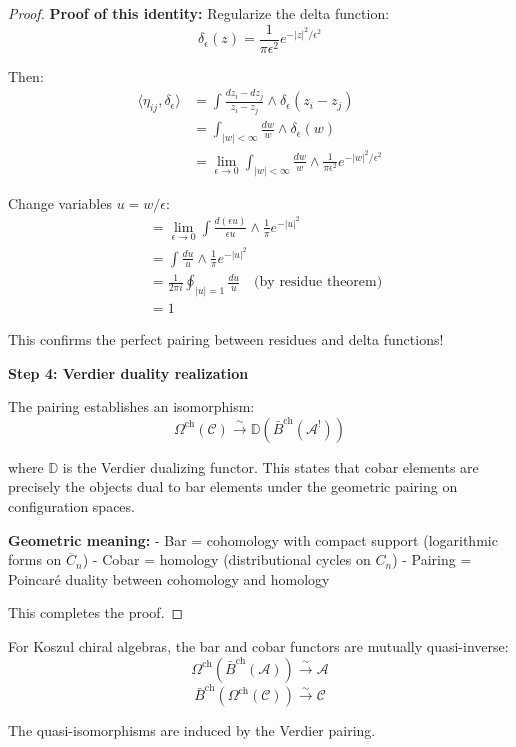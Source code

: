 \begin{proof}
\textbf{Proof of this identity:} Regularize the delta function:
$$\delta_\epsilon(z) = \frac{1}{\pi \epsilon^2} e^{-|z|^2/\epsilon^2}$$

Then:
\begin{align*}
\langle \eta_{ij}, \delta_\epsilon \rangle &= \int \frac{dz_i - dz_j}{z_i - z_j} 
\wedge \delta_\epsilon(z_i - z_j) \\
&= \int_{|w| < \infty} \frac{dw}{w} \wedge \delta_\epsilon(w) \\
&= \lim_{\epsilon \to 0} \int_{|w| < \infty} \frac{dw}{w} \wedge \frac{1}{\pi \epsilon^2} 
e^{-|w|^2/\epsilon^2}
\end{align*}

Change variables $u = w/\epsilon$:
\begin{align*}
&= \lim_{\epsilon \to 0} \int \frac{d(\epsilon u)}{\epsilon u} \wedge \frac{1}{\pi} 
e^{-|u|^2} \\
&= \int \frac{du}{u} \wedge \frac{1}{\pi} e^{-|u|^2} \\
&= \frac{1}{2\pi i} \oint_{|u|=1} \frac{du}{u} \quad \text{(by residue theorem)} \\
&= 1
\end{align*}

This confirms the perfect pairing between residues and delta functions!

\textbf{Step 4: Verdier duality realization}

The pairing establishes an isomorphism:
$$\Omega^{\text{ch}}(\mathcal{C}) \xrightarrow{\sim} \mathbb{D}(\bar{B}^{\text{ch}}(\mathcal{A}^!))$$

where $\mathbb{D}$ is the Verdier dualizing functor. This states that cobar elements 
are precisely the objects dual to bar elements under the geometric pairing on 
configuration spaces.

\textbf{Geometric meaning:} 
- Bar = cohomology with compact support (logarithmic forms on $\overline{C}_n$)
- Cobar = homology (distributional cycles on $C_n$)
- Pairing = Poincaré duality between cohomology and homology

This completes the proof.
\end{proof}

\begin{corollary}\label{cor:bar-cobar-inverse}
For Koszul chiral algebras, the bar and cobar functors are mutually quasi-inverse:
$$\Omega^{\text{ch}}(\bar{B}^{\text{ch}}(\mathcal{A})) \xrightarrow{\sim} \mathcal{A}$$
$$\bar{B}^{\text{ch}}(\Omega^{\text{ch}}(\mathcal{C})) \xrightarrow{\sim} \mathcal{C}$$

The quasi-isomorphisms are induced by the Verdier pairing.
\end{corollary}


